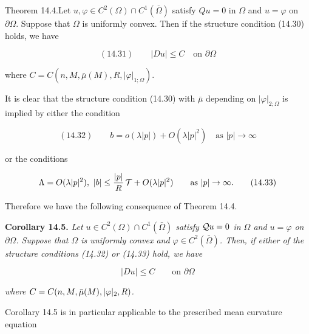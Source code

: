 \begin{theorem}\label{gt14-boundary-gradient-14-4}
Theorem 14.4.\quad Let \(u,\varphi\in C^2(\Omega)\cap C^1(\overline{\Omega})\) satisfy \(Qu=0\) in \(\Omega\) and \(u=\varphi\) on \(\partial\Omega\).
Suppose that \(\Omega\) is uniformly convex. Then if the structure condition (14.30) holds,
we have

\[
(14.31)\qquad |Du|\le C \quad \text{on }\partial\Omega
\]

where \(C=C(n,M,\bar\mu(M),R,|\varphi|_{1;\Omega})\).
\end{theorem}

It is clear that the structure condition (14.30) with \(\bar\mu\) depending on \(|\varphi|_{2;\Omega}\) is
implied by either the condition

\[
(14.32)\qquad b=o(\lambda|p|)+O(\lambda|p|^2) \quad \text{as } |p|\to\infty
\]






or the conditions

\begin{equation}
\Lambda = O(\lambda|p|^2),\ |b| \le \frac{|p|}{R}\,\mathcal{T} + O(\lambda|p|^2) \qquad \text{as } |p| \to \infty.
\tag{14.33}
\end{equation}

Therefore we have the following consequence of Theorem 14.4.

\begin{corollary}\label{gt14-boundary-gradient-14-5}
\textbf{Corollary 14.5.} \emph{Let $u \in C^2(\Omega) \cap C^1(\bar{\Omega})$ satisfy $\mathcal{Q} u = 0$ in $\Omega$ and $u = \varphi$ on $\partial\Omega$.
Suppose that $\Omega$ is uniformly convex and $\varphi \in C^2(\bar{\Omega})$. Then, if either of the structure
conditions (14.32) or (14.33) hold, we have}

\begin{equation}
|Du| \le C \qquad \text{on } \partial\Omega
\tag{14.34}
\end{equation}

\emph{where $C = C(n, M, \bar{\mu}(M), |\varphi|_2, R)$.}
\end{corollary}

Corollary 14.5 is in particular applicable to the prescribed mean curvature
equation

